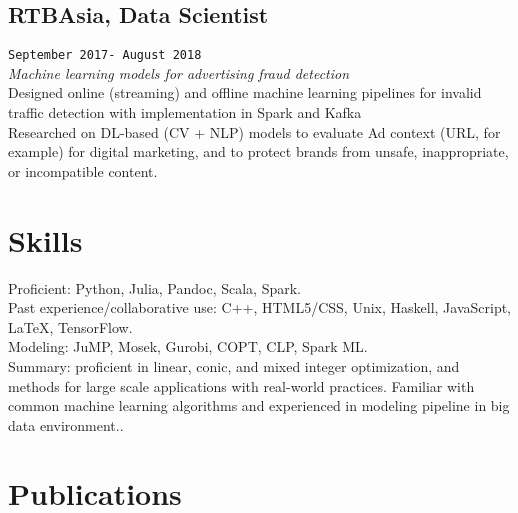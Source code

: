 \documentclass[11pt, letter]{article}
\begin{document}
\subsection{RTBAsia, Data Scientist}
\texttt{September 2017- August 2018} \\
\textit{Machine learning models for advertising fraud detection} \\
\bullet\quad Designed online (streaming) and offline machine learning
pipelines for invalid traffic detection with implementation in Spark and
Kafka \\
\bullet\quad Researched on DL-based (CV + NLP) models to evaluate Ad
context (URL, for example) for digital marketing, and to protect brands
from unsafe, inappropriate, or incompatible content. \\

\section{Skills}

Proficient: Python, Julia, Pandoc, Scala, Spark.\\[.15cm]
Past experience/collaborative use: C++, HTML5/CSS, Unix, Haskell,
JavaScript, LaTeX, TensorFlow.\\[.15cm]
Modeling: JuMP, Mosek, Gurobi, COPT, CLP, Spark ML.\\[.15cm]
Summary: proficient in linear, conic, and mixed integer optimization,
and methods for large scale applications with real-world practices.
Familiar with common machine learning algorithms and experienced in
modeling pipeline in big data environment..\\[.15cm]

\section{Publications}
\cite{zhang2017controlling} \\[.15cm]
\end{document}
